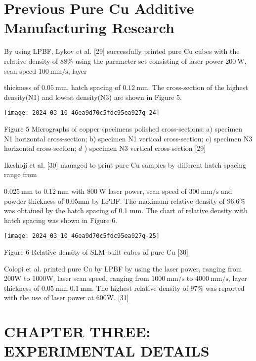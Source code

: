 \documentclass[10pt]{article}
\begin{document}
\section*{Previous Pure Cu Additive Manufacturing Research}
By using LPBF, Lykov et al. [29] successfully printed pure Cu cubes with the relative density of 88\% using the parameter set consisting of laser power $200 \mathrm{~W}$, scan speed $100 \mathrm{~mm} / \mathrm{s}$, layer

thickness of $0.05 \mathrm{~mm}$, hatch spacing of $0.12 \mathrm{~mm}$. The cross-section of the highest density(N1) and lowest density(N3) are shown in Figure 5.

\begin{center}
\texttt{[image: 2024\_03\_10\_46ea9d70c5fdc95ea927g-24]}
\end{center}

Figure 5 Micrographs of copper specimens polished cross-sections: a) specimen N1 horizontal cross-section; b) specimen N1 vertical cross-section; c) specimen N3 horizontal cross-section; $d$ ) specimen N3 vertical cross-section [29]

Ikeshoji et al. [30] managed to print pure Cu samples by different hatch spacing range from

$0.025 \mathrm{~mm}$ to $0.12 \mathrm{~mm}$ with $800 \mathrm{~W}$ laser power, scan speed of $300 \mathrm{~mm} / \mathrm{s}$ and powder thickness of 0.05mm by LPBF. The maximum relative density of $96.6 \%$ was obtained by the hatch spacing of 0.1 mm. The chart of relative density with hatch spacing was shown in Figure 6.

\begin{center}
\texttt{[image: 2024\_03\_10\_46ea9d70c5fdc95ea927g-25]}
\end{center}

Figure 6 Relative density of SLM-built cubes of pure Cu [30]

Colopi et al. printed pure Cu by LPBF by using the laser power, ranging from 200W to 1000W, laser scan speed, ranging from $1000 \mathrm{~mm} / \mathrm{s}$ to $4000 \mathrm{~mm} / \mathrm{s}$, layer thickness of $0.05 \mathrm{~mm}, 0.1 \mathrm{~mm}$. The highest relative density of $97 \%$ was reported with the use of laser power at 600W. [31]

\section*{CHAPTER THREE: EXPERIMENTAL DETAILS}
\end{document}
